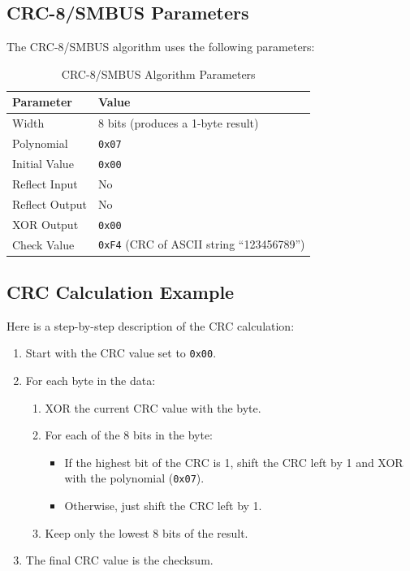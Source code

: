 \documentclass[12pt, titlepage]{article}
\begin{document}
\subsection{CRC-8/SMBUS Parameters}

The CRC-8/SMBUS algorithm uses the following parameters:

\begin{table}[H]
  \centering
  \begin{tabular}{ll}
    \toprule
    \textbf{Parameter} & \textbf{Value}                                    \\
    \midrule
    Width              & 8 bits (produces a 1-byte result)                 \\
    Polynomial         & \texttt{0x07}                                     \\
    Initial Value      & \texttt{0x00}                                     \\
    Reflect Input      & No                                                \\
    Reflect Output     & No                                                \\
    XOR Output         & \texttt{0x00}                                     \\
    Check Value        & \texttt{0xF4} (CRC of ASCII string ``123456789'') \\
    \bottomrule
  \end{tabular}
  \caption{CRC-8/SMBUS Algorithm Parameters}
\end{table}

\subsection{CRC Calculation Example}

Here is a step-by-step description of the CRC calculation:

\begin{enumerate}
  \item Start with the CRC value set to \texttt{0x00}.
  \item For each byte in the data:
        \begin{enumerate}
          \item XOR the current CRC value with the byte.
          \item For each of the 8 bits in the byte:
                \begin{itemize}
                  \item If the highest bit of the CRC is 1, shift the CRC left by 1 and XOR with the
                        polynomial (\texttt{0x07}).
                  \item Otherwise, just shift the CRC left by 1.
                \end{itemize}
          \item Keep only the lowest 8 bits of the result.
        \end{enumerate}
  \item The final CRC value is the checksum.
\end{enumerate}
\end{document}
